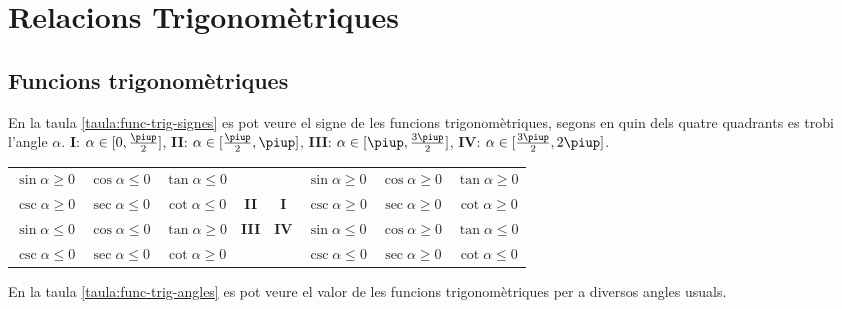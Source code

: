 \chapter{Relacions Trigonomètriques}

\section{Funcions trigonomètriques}

En la taula \vref{taula:func-trig-signes} es pot veure el signe de
les funcions trigonomètriques, segons en quin dels quatre quadrants
es trobi l'angle $\alpha$. \textbf{I}: $\alpha\in[0,\frac{\piup}{2}]$, \textbf{II}:
$\alpha\in[\frac{\piup}{2},\piup]$, \textbf{III}:
$\alpha\in[\piup,\frac{3\piup}{2}]$, \textbf{IV}:
$\alpha\in[\frac{3\piup}{2},2\piup]$.

\begin{center}
   \label{taula:func-trig-signes}
   \begin{tabular}{cccc|cccc}
   {\color{Green}$\sin\alpha \geq 0$} & {\color{Red}$\cos\alpha \leq 0$} & {\color{Red}$\tan\alpha \leq 0$} & & &
   {\color{Green}$\sin\alpha \geq 0$} & {\color{Green}$\cos\alpha \geq 0$} & {\color{Green}$\tan\alpha \geq 0$} \\
   {\color{Green}$\csc\alpha \geq 0$} & {\color{Red}$\sec\alpha \leq 0$} & {\color{Red}$\cot\alpha \leq 0$} & \textbf{II}&
   \textbf{I} & {\color{Green}$\csc\alpha \geq 0$} & {\color{Green}$\sec\alpha \geq 0$} & {\color{Green}$\cot\alpha \geq 0$} \\
   \hline
   {\color{Red}$\sin\alpha \leq 0$} & {\color{Red}$\cos\alpha \leq 0$} & {\color{Green}$\tan\alpha \geq 0$}
   &\textbf{III} &
   \textbf{IV} & {\color{Red}$\sin\alpha \leq 0$} & {\color{Green}$\cos\alpha \geq 0$} & {\color{Red}$\tan\alpha \leq 0$} \\
   {\color{Red}$\csc\alpha \leq 0$} & {\color{Red}$\sec\alpha \leq 0$} & {\color{Green}$\cot\alpha \geq 0$}  & & &
   {\color{Red}$\csc\alpha \leq 0$} & {\color{Green}$\sec\alpha \geq 0$} & {\color{Red}$\cot\alpha \leq 0$}
   \end{tabular}
\end{center}

En la taula \vref{taula:func-trig-angles} es pot veure el valor de
les funcions trigonomètriques per a diversos angles usuals.

